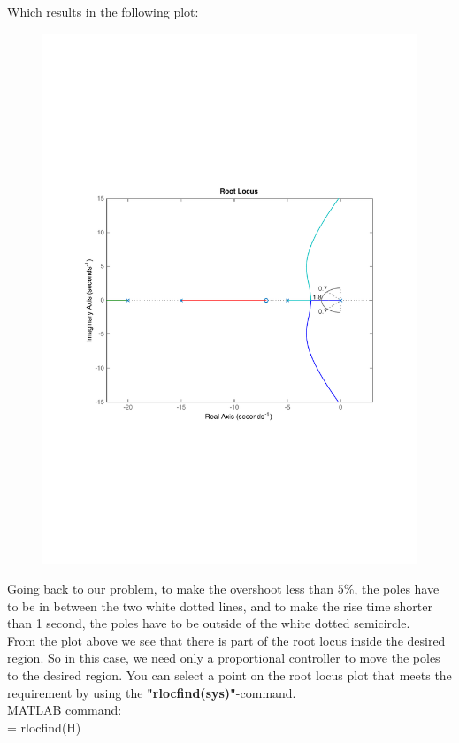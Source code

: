 \begin{frame}
	\begin{exampleblock}{}
		Which results in the following plot:
		\vspace{-0.5em}
		\begin{figure}
			\centering
			\includegraphics[width=0.7\linewidth]{matlab_ex2}
		\end{figure}
	\end{exampleblock}
\end{frame}


\begin{frame}
	\begin{exampleblock}{}
		Going back to our problem, to make the overshoot less than $5\%$, the poles have to be in between the two white dotted lines, and to make the rise time shorter than 1 second, the poles have to be outside of the white dotted semicircle.\\
		\vspace{1em}
		From the plot above we see that there is part of the root locus inside the desired region. So in this case, we need only a proportional controller to move the poles to the desired region. You can select a point on the root locus plot that meets the requirement by using the \textbf{"rlocfind(sys)"}-command.\\
		\vspace{1em}
		MATLAB command:\\
		[k,poles] = rlocfind(H)
	\end{exampleblock}
\end{frame}


